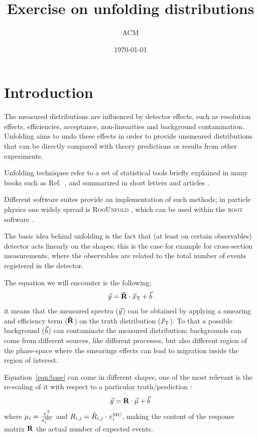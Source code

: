 \documentclass[a4paper,11pt]{article}
\title{Exercise on unfolding distributions}
\author{ACM}
\date{\today}
\begin{document}
\maketitle

\section*{Introduction}
The measured distributions are influenced by detector effects, such as resolution effects, efficiencies, 
acceptance, non-linearities and background contamination.
Unfolding aims to undo these effects in order to provide unsmeared distributions that can be directly compared with theory predictions 
or results from other experiments.

Unfolding techniques refer to a set of statistical tools briefly explained in many books such as Ref.~\cite{Cowan}, 
and summarized in short letters and articles \cite{Cowan:unfolding}. 

Different software suites provide an implementation of such methods; 
in particle physics one widely spread is {\scshape RooUnfold} \cite{RooUnfold}, 
which can be used within the {\scshape root} software \cite{ROOT}. 

The basic idea behind unfolding is the fact that (at least on certain observables) detector acts linearly on the shapes; 
this is the case for example for cross-section measurements, 
where the observables are related to the total number of events registered in the detector.

The equation we will encounter is the following:
\begin{equation}
	\vec{y}= \mathbf{\tilde{R}} \cdot \vec{x}_\textup{T} + \vec{b}
	\label{eqn:base}
\end{equation}
it means that the measured spectra ($\vec{y}$) can be obtained by applying a smearing and efficiency term ($\mathbf{\tilde{R}}$) on the truth distribution ($\vec{x}_\textup{T}$). 
To that a possible background ($\vec{b}$) can contaminate the measured distribution;
backgrounds can come from different sources, 
like different processes, but also different region of the phase-space 
where the smearings effects can lead to migration inside the region of interest.

Equation~\ref{eqn:base} can come in different shapes, 
one of the most relevant is the re-scaling of it with respect to a particular truth/prediction \cite{SVD}:
\begin{equation}
	\vec{y} = \mathbf{R} \cdot \vec{\mu} + \vec{b}
\end{equation}
where $\mu_{i} = \frac{x^\textup{T}_{i}}{x^\textup{MC}_{i}} $ and  $R_{i,j} = \tilde{R}_{i,j} \cdot x^\textup{MC}_{i} $, 
making the content of the response matrix $\mathbf{R}$ the actual number of expected events.
\end{document}

